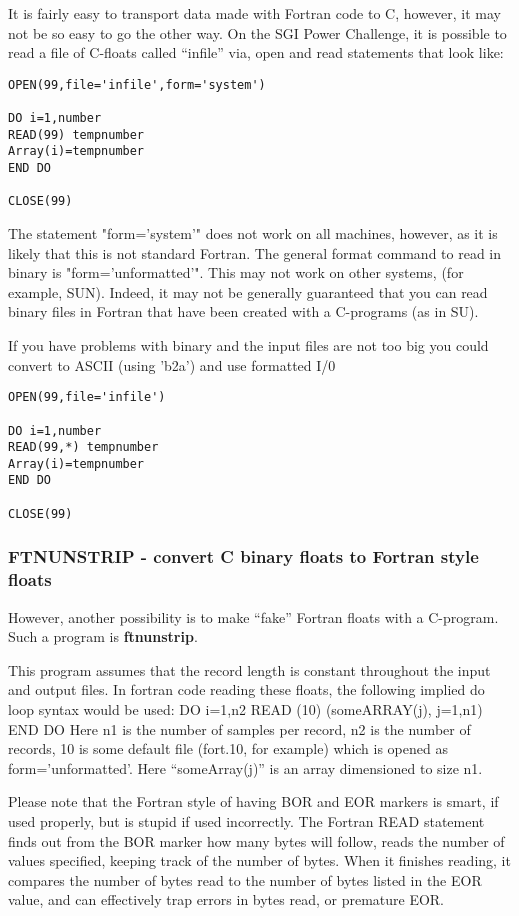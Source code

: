 {{{It is fairly easy to transport data made with Fortran code to C, however,
it may not be so easy to go the other way. On
the SGI Power Challenge, it is possible to read a file of C-floats
called ``infile'' via, open and read statements that look like:

{\small\begin{verbatim}
OPEN(99,file='infile',form='system') 

DO i=1,number
READ(99) tempnumber
Array(i)=tempnumber
END DO

CLOSE(99)
\end{verbatim}}\noindent

The statement "form='system'" does not work on all machines, however,
as it is likely that this is not standard Fortran.  The general format
command to read in binary is "form='unformatted'".  This may not work
on other systems, (for example, SUN). Indeed, it may not be generally
guaranteed that you can
read binary files in Fortran that have been created with a C-programs
(as in SU).

If you have problems with binary and the input files are not too
big you could convert to ASCII (using 'b2a') and use formatted I/0

{\small\begin{verbatim}
OPEN(99,file='infile')

DO i=1,number
READ(99,*) tempnumber
Array(i)=tempnumber
END DO

CLOSE(99)
\end{verbatim}}\noindent

\subsubsection{FTNUNSTRIP - convert C binary floats to Fortran style floats }

However, another possibility is to make ``fake'' Fortran floats
with a C-program. Such a program is {\bf ftnunstrip}.

This program assumes that the record length is constant
throughout the input and output files.
In fortran code reading these floats, the following implied
do loop syntax would be used:
        DO i=1,n2
                 READ (10) (someARRAY(j), j=1,n1)
        END DO
Here n1 is the number of samples per record, n2 is the number
of records, 10 is some default file (fort.10, for example) which
is opened as form='unformatted'. Here  ``someArray(j)'' is an array
dimensioned to size n1.

Please note that the Fortran style of having BOR and EOR markers
is smart, if used properly, but is stupid if used incorrectly. 
The Fortran READ statement finds out from the BOR marker how many 
bytes will follow, reads the number of values specified, keeping 
track of the number of bytes. When it finishes reading, it compares
the number of bytes read to the number of bytes listed in the EOR
value, and can effectively trap errors in bytes read, or premature
EOR.

}}}
